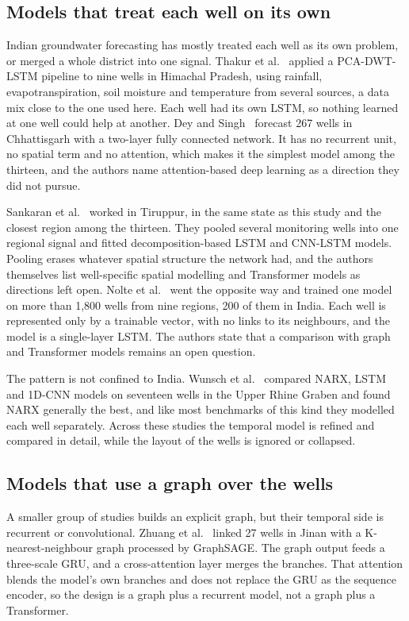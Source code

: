 \documentclass[conference]{IEEEtran}
\begin{document}
\subsection{Models that treat each well on its own}

Indian groundwater forecasting has mostly treated each well as its own problem, or merged a whole district into one signal. Thakur et al.~\cite{ref3} applied a PCA-DWT-LSTM pipeline to nine wells in Himachal Pradesh, using rainfall, evapotranspiration, soil moisture and temperature from several sources, a data mix close to the one used here. Each well had its own LSTM, so nothing learned at one well could help at another. Dey and Singh~\cite{ref12} forecast 267 wells in Chhattisgarh with a two-layer fully connected network. It has no recurrent unit, no spatial term and no attention, which makes it the simplest model among the thirteen, and the authors name attention-based deep learning as a direction they did not pursue.

Sankaran et al.~\cite{ref13} worked in Tiruppur, in the same state as this study and the closest region among the thirteen. They pooled several monitoring wells into one regional signal and fitted decomposition-based LSTM and CNN-LSTM models. Pooling erases whatever spatial structure the network had, and the authors themselves list well-specific spatial modelling and Transformer models as directions left open. Nolte et al.~\cite{ref14} went the opposite way and trained one model on more than 1,800 wells from nine regions, 200 of them in India. Each well is represented only by a trainable vector, with no links to its neighbours, and the model is a single-layer LSTM. The authors state that a comparison with graph and Transformer models remains an open question.

The pattern is not confined to India. Wunsch et al.~\cite{ref4} compared NARX, LSTM and 1D-CNN models on seventeen wells in the Upper Rhine Graben and found NARX generally the best, and like most benchmarks of this kind they modelled each well separately. Across these studies the temporal model is refined and compared in detail, while the layout of the wells is ignored or collapsed.

\subsection{Models that use a graph over the wells}

A smaller group of studies builds an explicit graph, but their temporal side is recurrent or convolutional. Zhuang et al.~\cite{ref5} linked 27 wells in Jinan with a K-nearest-neighbour graph processed by GraphSAGE. The graph output feeds a three-scale GRU, and a cross-attention layer merges the branches. That attention blends the model's own branches and does not replace the GRU as the sequence encoder, so the design is a graph plus a recurrent model, not a graph plus a Transformer.
\end{document}
